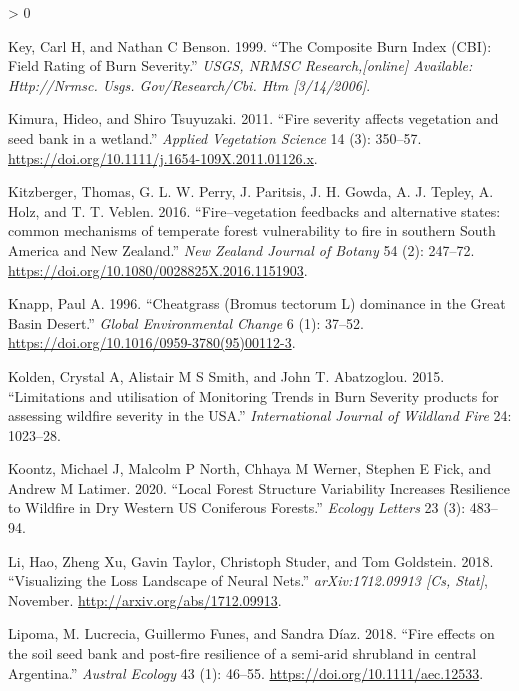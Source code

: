 \documentclass[
  12pt,
]{article}
\newlength{\cslhangindent}
\newenvironment{CSLReferences}[2] %
 {%
  \setlength{\parindent}{0pt}
  \ifodd #1 \everypar{\setlength{\hangindent}{\cslhangindent}}\ignorespaces\fi
  \ifnum #2 > 0
  \setlength{\parskip}{#2\baselineskip}
  \fi
 }%
 {}
\begin{document}
\begin{CSLReferences}{1}{0}
\leavevmode\hypertarget{ref-Key1999}{}%
Key, Carl H, and Nathan C Benson. 1999. {``The Composite Burn Index
(CBI): Field Rating of Burn Severity.''} \emph{USGS, NRMSC
Research,{[}online{]} Available: Http://Nrmsc. Usgs. Gov/Research/Cbi.
Htm {[}3/14/2006{]}}.

\leavevmode\hypertarget{ref-Kimura2011}{}%
Kimura, Hideo, and Shiro Tsuyuzaki. 2011. {``{Fire severity affects
vegetation and seed bank in a wetland}.''} \emph{Applied Vegetation
Science} 14 (3): 350--57.
\url{https://doi.org/10.1111/j.1654-109X.2011.01126.x}.

\leavevmode\hypertarget{ref-Kitzberger2016}{}%
Kitzberger, Thomas, G. L. W. Perry, J. Paritsis, J. H. Gowda, A. J.
Tepley, A. Holz, and T. T. Veblen. 2016. {``{Fire--vegetation feedbacks
and alternative states: common mechanisms of temperate forest
vulnerability to fire in southern South America and New Zealand}.''}
\emph{New Zealand Journal of Botany} 54 (2): 247--72.
\url{https://doi.org/10.1080/0028825X.2016.1151903}.

\leavevmode\hypertarget{ref-Knapp1996}{}%
Knapp, Paul A. 1996. {``{Cheatgrass (Bromus tectorum L) dominance in the
Great Basin Desert}.''} \emph{Global Environmental Change} 6 (1):
37--52. \url{https://doi.org/10.1016/0959-3780(95)00112-3}.

\leavevmode\hypertarget{ref-Kolden2015}{}%
Kolden, Crystal A, Alistair M S Smith, and John T. Abatzoglou. 2015.
{``{Limitations and utilisation of Monitoring Trends in Burn Severity
products for assessing wildfire severity in the USA}.''}
\emph{International Journal of Wildland Fire} 24: 1023--28.

\leavevmode\hypertarget{ref-Koontz2020}{}%
Koontz, Michael J, Malcolm P North, Chhaya M Werner, Stephen E Fick, and
Andrew M Latimer. 2020. {``Local Forest Structure Variability Increases
Resilience to Wildfire in Dry Western US Coniferous Forests.''}
\emph{Ecology Letters} 23 (3): 483--94.

\leavevmode\hypertarget{ref-Li2018}{}%
Li, Hao, Zheng Xu, Gavin Taylor, Christoph Studer, and Tom Goldstein.
2018. {``Visualizing the {Loss} {Landscape} of {Neural} {Nets}.''}
\emph{arXiv:1712.09913 {[}Cs, Stat{]}}, November.
\url{http://arxiv.org/abs/1712.09913}.

\leavevmode\hypertarget{ref-Lipoma2018}{}%
Lipoma, M. Lucrecia, Guillermo Funes, and Sandra Díaz. 2018. {``{Fire
effects on the soil seed bank and post-fire resilience of a semi-arid
shrubland in central Argentina}.''} \emph{Austral Ecology} 43 (1):
46--55. \url{https://doi.org/10.1111/aec.12533}.


\end{CSLReferences}
\end{document}
